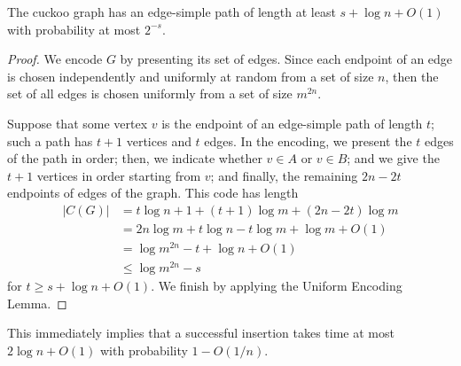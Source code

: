 \documentclass{patmorin}
\begin{document}
\begin{lem}
  The cuckoo graph has an edge-simple path of length at least
  $s + \log n + O(1)$ with probability at most $2^{-s}$.
\end{lem}
\begin{proof}
  We encode $G$ by presenting its set of edges. Since each endpoint of
  an edge is chosen independently and uniformly at random from a set
  of size $n$, then the set of all edges is chosen uniformly from a
  set of size $m^{2n}$.

  Suppose that some vertex $v$ is the endpoint of an edge-simple path
  of length $t$; such a path has $t + 1$ vertices and $t$ edges. In
  the encoding, we present the $t$ edges of the path in order; then,
  we indicate whether $v \in A$ or $v \in B$; and we give the $t + 1$
  vertices in order starting from $v$; and finally, the remaining
  $2n - 2t$ endpoints of edges of the graph. This code has length
  \begin{align*}
    |C(G)| &= t \log n + 1 + (t + 1) \log m + (2n - 2t) \log m\\
           &= 2n \log m + t \log n - t \log m + \log m + O(1) \\
           &= \log m^{2n} - t + \log n + O(1) \tag{since $m = 2n$} \\
           &\leq \log m^{2n} - s
  \end{align*}
  for $t \geq s + \log n + O(1)$. We finish by applying the Uniform
  Encoding Lemma.
\end{proof}
This immediately implies that a successful insertion takes time at
most $2 \log n + O(1)$ with probability $1 - O(1/n)$.
\end{document}
